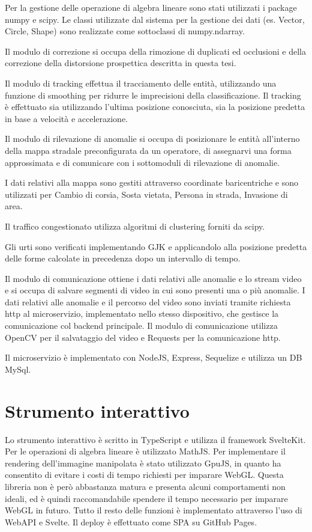 Per la gestione delle operazione di algebra lineare sono stati utilizzati i package numpy e scipy.
Le classi utilizzate dal sistema per la gestione dei dati (es. Vector, Circle, Shape) sono realizzate come sottoclassi di numpy.ndarray.

Il modulo di correzione si occupa della rimozione di duplicati ed occlusioni e della correzione della distorsione prospettica descritta in questa tesi.

Il modulo di tracking effettua il tracciamento delle entità, utilizzando una funzione di smoothing per ridurre le imprecisioni della classificazione.
Il tracking è effettuato sia utilizzando l'ultima posizione conosciuta, sia la posizione predetta in base a velocità e accelerazione.

Il modulo di rilevazione di anomalie si occupa di posizionare le entità all'interno della mappa stradale preconfigurata da un operatore, di assegnarvi una forma approssimata e di comunicare con i sottomoduli di rilevazione di anomalie.

I dati relativi alla mappa sono gestiti attraverso coordinate baricentriche e sono utilizzati per Cambio di corsia, Sosta vietata, Persona in strada, Invasione di area.

Il traffico congestionato utilizza algoritmi di clustering forniti da scipy.

Gli urti sono verificati implementando GJK e applicandolo alla posizione predetta delle forme calcolate in precedenza dopo un intervallo di tempo.

Il modulo di comunicazione ottiene i dati relativi alle anomalie e lo stream video e si occupa di salvare segmenti di video in cui sono presenti una o più anomalie.
I dati relativi alle anomalie e il percorso del video sono inviati tramite richiesta http al microservizio, implementato nello stesso dispositivo, che gestisce la comunicazione col backend principale.
Il modulo di comunicazione utilizza OpenCV per il salvataggio del video e Requests per la comunicazione http.

Il microservizio è implementato con NodeJS, Express, Sequelize e utilizza un DB MySql.

\section{Strumento interattivo}
Lo strumento interattivo è scritto in TypeScript e utilizza il framework SvelteKit.
Per le operazioni di algebra lineare è utilizzato MathJS.
Per implementare il rendering dell'immagine manipolata è stato utilizzato GpuJS, in quanto ha consentito di evitare i costi di tempo richiesti per imparare WebGL.
Questa libreria non è però abbastanza matura e presenta alcuni comportamenti non ideali, ed è quindi raccomandabile spendere il tempo necessario per imparare WebGL in futuro.
Tutto il resto delle funzioni è implementato attraverso l'uso di WebAPI e Svelte.
Il deploy è effettuato come SPA su GitHub Pages.
